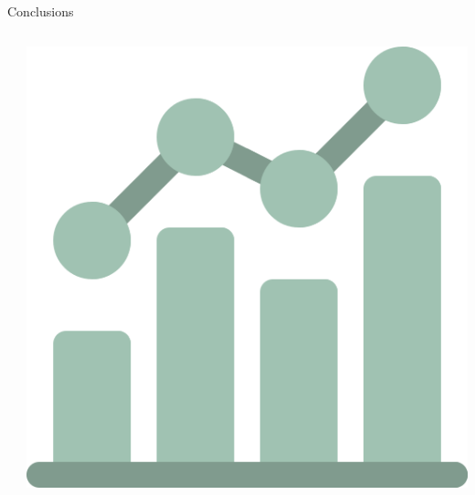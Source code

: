 \documentclass[9pt, pstricks, xcolor=dvipsnames]{beamer}
\begin{document}
\begin{frame}{Conclusions}
\begin{columns}
\begin{column}{0.33\textwidth}
			\pause
		\end{column}
		\begin{column}{0.33\textwidth}
			\centering
			\includegraphics[scale=0.2]{images/metrics.png}
		\end{column}
	\end{columns}

\end{frame}
\end{document}
